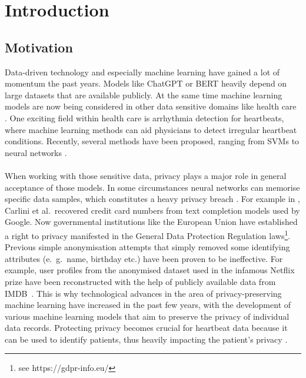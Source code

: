 \section{Introduction}

\subsection{Motivation}

Data-driven technology and especially machine learning have gained a lot of momentum the past years. Models like ChatGPT or BERT heavily depend on large datasets that are available publicly. At the same time machine learning models are now being considered in other data sensitive domains like health care \parencite[see][]{ai_and_med,aimed2,aimed3,aimed4}. One exciting field within health care is arrhythmia detection for heartbeats, where machine learning methods can aid physicians to detect irregular heartbeat conditions. Recently, several methods have been proposed, ranging from SVMs to neural networks \parencite[see review][]{arr_rev}.

\paragraph{}
When working with those sensitive data, privacy plays a major role in general acceptance of those models. In some circumstances neural networks can memorise specific data samples, which constitutes a heavy privacy breach \Parencite[see][]{feldman2021does}. For example in \Parencite{carlini19}, Carlini et al.\ recovered credit card numbers from text completion models used by Google. Now governmental institutions like the European Union have established a right to privacy manifested in the General Data Protection Regulation laws\footnote[1]{see https://gdpr-info.eu/}. Previous simple anonymisation attempts that simply removed some identifying attributes (e.\ g.\ name, birthday etc.) have been proven to be ineffective. For example, user profiles from the anonymised dataset used in the infamous Netflix prize have been reconstructed with the help of publicly available data from IMDB~\cite{4531148}. This is why technological advances in the area of privacy-preserving machine learning have increased in the past few years, with the development of various machine learning models that aim to preserve the privacy of individual data records. Protecting privacy becomes crucial for heartbeat data because it can be used to identify patients, thus heavily impacting the patient's privacy \parencite[see heartbeat biometrics][]{heartb_auth,hegde2011heartbeat}.

